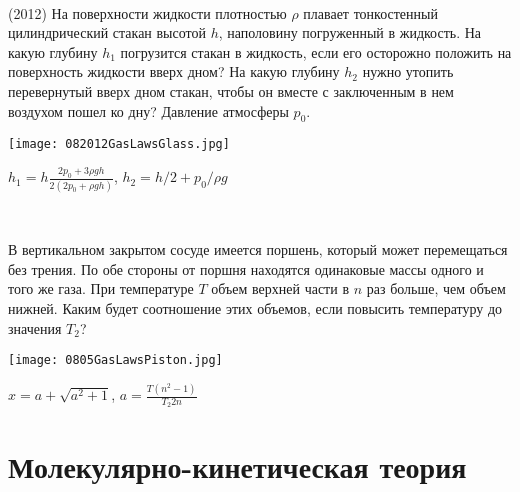 \begin{ex}
\hspace{0pt} \\
\begin{minipage}{.65\textwidth}
(2012) На поверхности жидкости плотностью $\rho$ плавает тонкостенный цилиндрический стакан высотой $h$, наполовину погруженный в жидкость. 
На какую глубину $h_1$ погрузится стакан в жидкость, если его осторожно положить на поверхность жидкости вверх дном? 
На какую глубину $h_2$ нужно утопить перевернутый вверх дном стакан, чтобы он вместе с заключенным в нем воздухом пошел ко дну? Давление атмосферы $p_0$.
\end{minipage}
\begin{minipage}{.35\textwidth}
\centering
\texttt{[image: 082012GasLawsGlass.jpg]}
\end{minipage}
\begin{ans}
$h_1 = h \frac{2p_0+3\rho gh}{2(2p_0 + \rho gh)}$, $h_2 = h/2 + p_0/\rho g$
\end{ans}
\end{ex}

\begin{ex}
\hspace{0pt} \\
\begin{minipage}{.65\textwidth}
В вертикальном закрытом сосуде имеется поршень, который может перемещаться без трения. 
По обе стороны от поршня находятся одинаковые массы одного и того же газа. 
При температуре $T$ объем верхней части в $n$ раз больше, чем объем нижней. 
Каким будет соотношение этих объемов, если повысить температуру до значения $T_2$?
\end{minipage}
\begin{minipage}{.35\textwidth}
\centering
\texttt{[image: 0805GasLawsPiston.jpg]}
\end{minipage}
\begin{ans}
$x = a + \sqrt{a^2+1}$, $a = \frac{T (n^2 - 1)}{T_2 2n}$
\end{ans}
\end{ex}

\section{Молекулярно-кинетическая теория}

